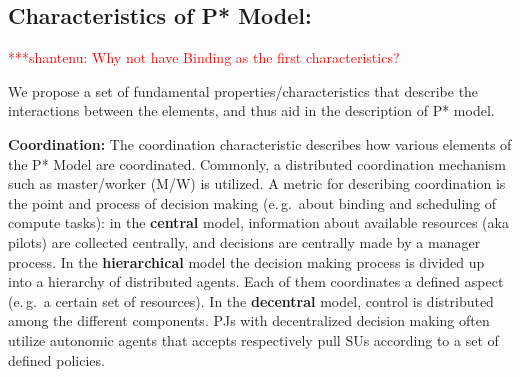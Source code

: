 \documentclass[conference,final]{IEEEtran}
\newcommand{\jhanote}[1]{ {\textcolor{red} { ***shantenu: #1 }}}
\newcommand{\jhanote}[1]{}
\newcommand{\upp}{\vspace*{-0.5em}}
\begin{document}
 

% 
% 


\subsection{Characteristics of P* Model:\upp\upp}
\label{sec:p_star_elements}

\jhanote{Why not have Binding as the first characteristics?}

We propose a set of fundamental properties/characteristics that
describe the interactions between the elements, and thus aid in the
description of P* model.



\textbf{Coordination:} The coordination characteristic describes how
various elements of the P* Model are coordinated.
Commonly, a distributed coordination mechanism such as master/worker
(M/W) is utilized. A metric for describing coordination is the point and
process of decision making (e.\,g.\ about binding and
scheduling of compute tasks): in the \textbf{central} model,
information about available resources (aka pilots) are collected
centrally, and decisions are centrally made by a manager
process. %
In the \textbf{hierarchical} model the decision making process is
divided up into a hierarchy of distributed agents. Each of them
coordinates a defined aspect (e.\,g.\ a certain set of resources). In
the \textbf{decentral} model, control is distributed among the
different components.  PJs with decentralized decision making often
utilize autonomic agents that accepts respectively pull SUs according
to a set of defined policies.
\end{document}
